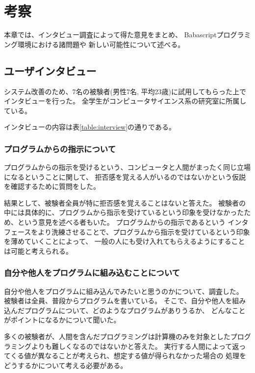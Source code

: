 \chapter{考察}\label{chap:discussion}

本章では、インタビュー調査によって得た意見をまとめ、
Babascriptプログラミング環境における諸問題や
新しい可能性について述べる。

\newpage

\section{ユーザインタビュー}\label{ux30e6ux30fcux30b6ux30a4ux30f3ux30bfux30d3ux30e5ux30fc}

システム改善のため、7名の被験者(男性7名,
平均23歳)に試用してもらった上でインタビューを行った。
全学生がコンピュータサイエンス系の研究室に所属している。

インタビューの内容は表\ref{table:interview}の通りである。

\subsection{プログラムからの指示について}\label{ux30d7ux30edux30b0ux30e9ux30e0ux304bux3089ux306eux6307ux793aux306bux3064ux3044ux3066}

プログラムからの指示を受けるという、コンピュータと人間がまったく同じ立場になるということに関して、
拒否感を覚える人がいるのではないかという仮説を確認するために質問をした。

結果として、被験者全員が特に拒否感を覚えることはないと答えた。
被験者の中には具体的に、プログラムから指示を受けているという印象を受けなかったため、という意見を述べる者もいた。
プログラムからの指示であるという
インタフェースをより洗練させることで、プログラムから指示を受けているという印象を薄めていくことによって、
一般の人にも受け入れてもらえるようにすることは可能と考えられる。

\subsection{自分や他人をプログラムに組み込むことについて}\label{sec:programming-you-and-i}

自分や他人をプログラムに組み込んでみたいと思うのかについて、調査した。
被験者は全員、普段からプログラムを書いている。
そこで、自分や他人を組み込んだプログラムについて、どのようなプログラムがありうるか、
どんなことがポイントになるかについて聞いた。

多くの被験者が、人間を含んだプログラミングは計算機のみを対象としたプログラミングよりも難しくなるのではないかと答えた。
実行する人間によって返ってくる値が異なることが考えられ、想定する値が得られなかった場合の
処理をどうするかについて考える必要がある。


